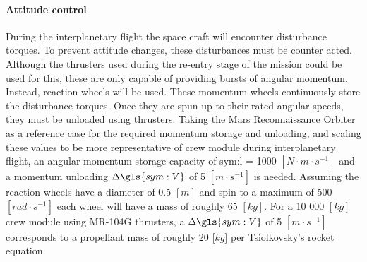 \paragraph{Attitude control}
During the interplanetary flight the space craft will encounter disturbance torques. To prevent attitude changes, these disturbances must be counter acted. Although the thrusters used during the re-entry stage of the mission could be used for this, these are only capable of providing bursts of angular momentum. Instead, reaction wheels will be used. These momentum wheels continuously store the disturbance torques. Once they are spun up to their rated angular speeds, they must be unloaded using thrusters. Taking the Mars Reconnaissance Orbiter \cite{You2007} as a reference case for the required momentum storage and unloading, and scaling these values to be more representative of crew module during interplanetary flight, an angular momentum storage capacity of \gls{sym:l} = 1000 $[N \cdot m\cdot s^{-1}]$ and a momentum unloading $\Delta\gls{sym:V}$ of 5 $[m\cdot s^{-1}]$ is needed. Assuming the reaction wheels have a diameter of 0.5 $[m]$ and spin to a maximum of 500 $[rad \cdot s^{-1}]$ each wheel will have a mass of roughly 65 $[kg]$. For a 10 000 $[kg]$ crew module using MR-104G thrusters, a $\Delta\gls{sym:V}$ of 5 $[m\cdot s^{-1}]$ corresponds to a propellant mass of roughly 20 [$kg$] per Tsiolkovsky's rocket equation. 
